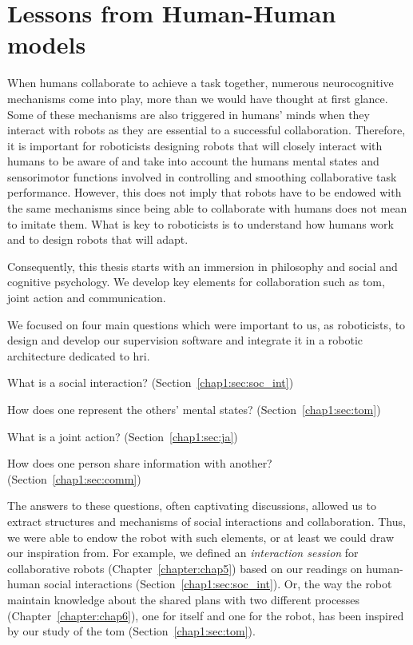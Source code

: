 \documentclass[a4paper,11pt,twoside]{StyleThese}
\begin{document}
	\setcounter{chapter}{0} %
	\dominitoc
	\faketableofcontents
	\fi


\chapter{Lessons from Human-Human models}
\label{chapter:chap1}
\minitoc

When humans collaborate to achieve a task together, numerous neurocognitive mechanisms come into play, more than we would have thought at first glance. Some of these mechanisms are also triggered in humans’ minds when they interact with robots as they are essential to a successful collaboration. Therefore, it is important for roboticists designing robots that will closely interact with humans to be aware of and take into account the humans mental states and sensorimotor functions involved in controlling and smoothing collaborative task performance.  However, this does not imply that robots have to be endowed with the same mechanisms since being able to collaborate with humans does not mean to imitate them. What is key to roboticists is to understand how humans work and to design robots that will adapt. 

Consequently, this thesis starts with an immersion in philosophy and social and cognitive psychology. We develop key elements for collaboration such as \acrlong{tom}, joint action and communication.

We focused on four main questions which were important to us, as roboticists, to design and develop our supervision software and integrate it in a robotic architecture dedicated to \acrshort{hri}. 

\begin{bulletList}
	\item What is a social interaction? (Section~\ref{chap1:sec:soc_int})
	\item How does one represent the others' mental states? (Section~\ref{chap1:sec:tom})
	\item What is a joint action? (Section~\ref{chap1:sec:ja})
	\item How does one person share information with another? (Section~\ref{chap1:sec:comm})
\end{bulletList}

The answers to these questions, often captivating discussions, allowed us to extract structures and mechanisms of social interactions and collaboration. Thus, we were able to endow the robot with such elements, or at least we could draw our inspiration from. For example, we defined an \emph{interaction session} for collaborative robots (Chapter~\ref{chapter:chap5}) based on our readings on human-human social interactions (Section~\ref{chap1:sec:soc_int}). Or, the way the robot maintain knowledge about the shared plans with two different processes (Chapter~\ref{chapter:chap6}), one for itself and one for the robot, has been inspired by our study of the \acrlong{tom} (Section~\ref{chap1:sec:tom}).
\end{document}
